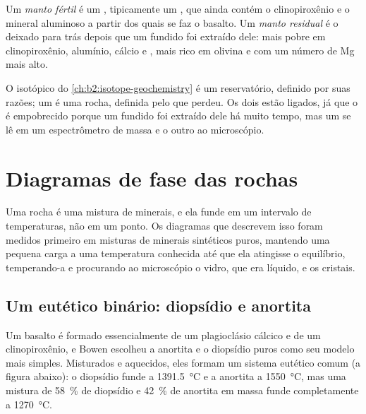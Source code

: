 \begin{definition}\label{def:b2:mantle-melting:fertility}
Um \emph{manto fértil} é um , tipicamente um
, que ainda contém o clinopiroxênio e o mineral aluminoso a partir dos
quais se faz o basalto. Um \emph{manto residual} é o
 deixado para trás depois que um fundido foi extraído dele: mais pobre em
clinopiroxênio, alumínio, cálcio e , mais rico em
olivina e com um número de Mg mais alto.
\end{definition}

O  isotópico do \cref{ch:b2:isotope-geochemistry} é um reservatório,
definido por suas razões; um  é uma rocha, definida pelo que perdeu.
Os dois estão ligados, já que o  é empobrecido porque um fundido foi
extraído dele há muito tempo, mas um se lê em um espectrômetro de massa e o outro
ao microscópio.

\section{Diagramas de fase das rochas}\label{sec:b2:mantle-melting:diagrams}

Uma rocha é uma mistura de minerais, e ela funde em um intervalo de temperaturas, não em
um ponto. Os diagramas que descrevem isso foram medidos primeiro em misturas de
minerais sintéticos puros, mantendo uma pequena carga a uma temperatura conhecida até que ela
atingisse o equilíbrio, temperando-a e procurando ao microscópio o vidro,
que era líquido, e os cristais.

\subsection*{Um eutético binário: diopsídio e anortita}

Um basalto é formado essencialmente de um plagioclásio cálcico e de um clinopiroxênio, e
Bowen escolheu a anortita e o diopsídio puros como seu modelo mais simples. Misturados e aquecidos,
eles formam um sistema eutético
comum (a figura abaixo): o diopsídio funde a \qty{1391.5}{\celsius} e a anortita
a \qty{1550}{\celsius}, mas uma mistura de \qty{58}{\percent} de diopsídio e
\qty{42}{\percent} de anortita em massa funde completamente a \qty{1270}{\celsius}.

